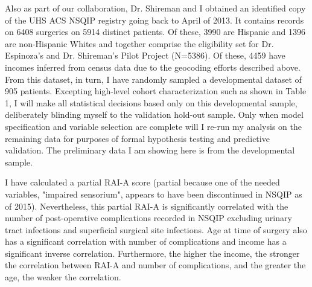 Also as part of our collaboration, Dr. Shireman and I obtained an identified copy of the UHS ACS NSQIP registry going back to April of 2013. It contains records on 6408 surgeries on 5914 distinct patients. Of these, 3990 are Hispanic and 1396 are non-Hispanic Whites and together comprise the eligibility set for Dr. Espinoza's and Dr. Shireman's Pilot Project (N=5386). Of these, 4459 have incomes inferred from census data due to the geocoding efforts described above. From this dataset, in turn, I have randomly sampled a developmental dataset of 905 patients. Excepting high-level cohort characterization such as shown in Table 1, I will make all statistical decisions based only on this developmental sample, deliberately blinding myself to the validation hold-out sample. Only when model specification and variable selection are complete will I re-run my analysis on the remaining data for purposes of formal hypothesis testing and predictive validation. The preliminary data I am showing here is from the developmental sample.

I have calculated a partial RAI-A score (partial because one of the needed variables, "impaired sensorium", appears to have been discontinued in NSQIP as of 2015). Nevertheless, this partial RAI-A is significantly correlated with the number of post-operative complications recorded in NSQIP excluding urinary tract infections and superficial surgical site infections. Age at time of surgery also has a significant correlation with number of complications and income has a significant inverse correlation. Furthermore, the higher the income, the stronger the correlation between RAI-A and number of complications, and the greater the age, the weaker the correlation.


